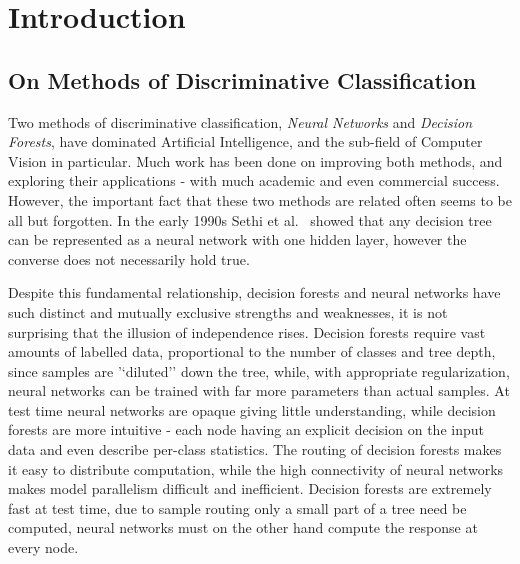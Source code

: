 \documentclass[thesis]{subfiles}
\begin{document}

\chapter{Introduction}  %

\ifpdf
    \graphicspath{{Figs/Raster/}{Figs/PDF/}{Figs/}}
\else
    \graphicspath{{Figs/Vector/}{Figs/}}
\fi


\section{On Methods of Discriminative Classification} %

Two methods of discriminative classification, \emph{Neural Networks} and \emph{Decision Forests}, have dominated Artificial Intelligence, and the sub-field of Computer Vision in particular. Much work has been done on improving both methods, and exploring their applications - with much academic and even commercial success. However, the important fact that these two methods are related often seems to be all but forgotten. In the early 1990s Sethi et al.~\cite{Sethi1990} showed that any decision tree can be represented as a neural network with one hidden layer, however the converse does not necessarily hold true.

Despite this fundamental relationship, decision forests and neural networks have such distinct and mutually exclusive strengths and weaknesses, it is not surprising that the illusion of independence rises. Decision forests require vast amounts of labelled data, proportional to the number of classes and tree depth, since samples are '`diluted'' down the tree, while, with appropriate regularization, neural networks can be trained with far more parameters than actual samples. At test time neural networks are opaque giving little understanding, while decision forests are more intuitive - each node having an explicit decision on the input data and even describe per-class statistics. The routing of decision forests makes it easy to distribute computation, while the high connectivity of neural networks makes model parallelism difficult and inefficient. Decision forests are extremely fast at test time, due to sample routing only a small part of a tree need be computed, neural networks must on the other hand compute the response at every node.  
\end{document}
